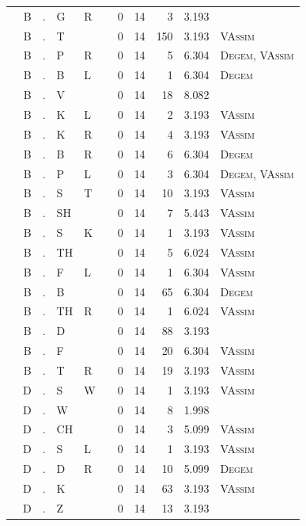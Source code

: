 \documentclass[12pt]{article}
\begin{document}
\begin{longtable}{r@{ } r@{ } c@{ } l@{ } l@{ } l@{ } r r r r l }
 & B & . & G & R &  & 0 & 14 & 3 & 3.193 &  \\
 & B & . & T &  &  & 0 & 14 & 150 & 3.193 & \textsc{VAssim} \\
 & B & . & P & R &  & 0 & 14 & 5 & 6.304 & \textsc{Degem}, \textsc{VAssim} \\
 & B & . & B & L &  & 0 & 14 & 1 & 6.304 & \textsc{Degem} \\
 & B & . & V &  &  & 0 & 14 & 18 & 8.082 &  \\
 & B & . & K & L &  & 0 & 14 & 2 & 3.193 & \textsc{VAssim} \\
 & B & . & K & R &  & 0 & 14 & 4 & 3.193 & \textsc{VAssim} \\
 & B & . & B & R &  & 0 & 14 & 6 & 6.304 & \textsc{Degem} \\
 & B & . & P & L &  & 0 & 14 & 3 & 6.304 & \textsc{Degem}, \textsc{VAssim} \\
 & B & . & S & T &  & 0 & 14 & 10 & 3.193 & \textsc{VAssim} \\
 & B & . & SH &  &  & 0 & 14 & 7 & 5.443 & \textsc{VAssim} \\
 & B & . & S & K &  & 0 & 14 & 1 & 3.193 & \textsc{VAssim} \\
 & B & . & TH &  &  & 0 & 14 & 5 & 6.024 & \textsc{VAssim} \\
 & B & . & F & L &  & 0 & 14 & 1 & 6.304 & \textsc{VAssim} \\
 & B & . & B &  &  & 0 & 14 & 65 & 6.304 & \textsc{Degem} \\
 & B & . & TH & R &  & 0 & 14 & 1 & 6.024 & \textsc{VAssim} \\
 & B & . & D &  &  & 0 & 14 & 88 & 3.193 &  \\
 & B & . & F &  &  & 0 & 14 & 20 & 6.304 & \textsc{VAssim} \\
 & B & . & T & R &  & 0 & 14 & 19 & 3.193 & \textsc{VAssim} \\
 & D & . & S & W &  & 0 & 14 & 1 & 3.193 & \textsc{VAssim} \\
 & D & . & W &  &  & 0 & 14 & 8 & 1.998 &  \\
 & D & . & CH &  &  & 0 & 14 & 3 & 5.099 & \textsc{VAssim} \\
 & D & . & S & L &  & 0 & 14 & 1 & 3.193 & \textsc{VAssim} \\
 & D & . & D & R &  & 0 & 14 & 10 & 5.099 & \textsc{Degem} \\
 & D & . & K &  &  & 0 & 14 & 63 & 3.193 & \textsc{VAssim} \\
 & D & . & Z &  &  & 0 & 14 & 13 & 3.193 &  \\

\end{longtable}
\end{document}
